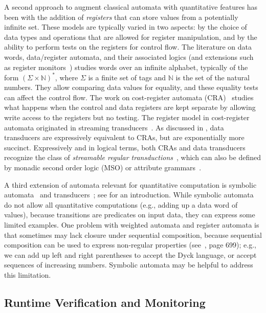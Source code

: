 A second approach to augment classical automata with quantitative features has been with the addition of \emph{registers} that can store values from a potentially infinite set. These models are typically varied in two aspects: by the choice of data types and operations that are allowed for register manipulation, and by the ability to perform tests on the registers for control flow.
The literature on data words, data/register automata, and their associated logics \cite{KF1994FMA, NSV2004FSM, DL2009LFQ, BS2010NRDL, BDMSS2011LDW} (and extensions such as register monitors~\cite{FHS2018}) studies words over an infinite alphabet, typically of the form $(\Sigma \times \mathbb{N})^*$,
where $\Sigma$ is a finite set of tags and $\mathbb{N}$ is the set of the natural numbers.
They allow comparing data values for equality, and these equality tests can affect the control flow.
The work on cost-register automata (CRA)~\cite{AdADRY2013CRA} studies what happens when the control and data registers are kept separate by allowing write access to the registers but no testing.
The register model in cost-register automata originated in streaming transducers~\cite{AC2010SST,AC2011STA,AdA2012STT}.
As discussed in ,
data transducers are expressively equivalent to CRAs, but are exponentially more succinct.
Expressively and in logical terms, both CRAs and data transducers recognize the class of \emph{streamable regular transductions}~, which can also be defined by monadic second order logic (MSO) or attribute grammars~\cite{EM1999MTT,BE2000}.

A third extension of automata relevant for quantitative computation is symbolic automata~\cite{d2014minimization,veanes2012symbolic-toolkit} and transducers~\cite{veanes2012symbolic,d2013equivalence};
see \cite{d2021automata} for an introduction.
While symbolic automata do not allow all quantitative computations (e.g., adding up a data word of values), because transitions are predicates on input data, they can express some limited examples.
One problem with weighted automata and register automata is that sometimes may lack closure under sequential composition, because sequential composition can be used to express non-regular properties (see~\cite{StreamQRE}, page 699); e.g., we can add up left and right parentheses to accept the Dyck language, or accept sequences of increasing numbers.
Symbolic automata may be helpful to address this limitation.

\subsection{Runtime Verification and Monitoring}

